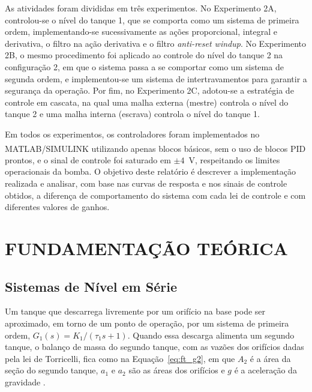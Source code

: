 \documentclass[a4paper,12pt]{article}
\begin{document}
\begin{justify}
    \hspace{4ex}As atividades foram divididas em três experimentos. No Experimento 2A, controlou-se o nível do tanque 1, que se comporta como um sistema de primeira ordem, implementando-se sucessivamente as ações proporcional, integral e derivativa, o filtro na ação derivativa e o filtro \textit{anti-reset windup}. No Experimento 2B, o mesmo procedimento foi aplicado ao controle do nível do tanque 2 na configuração 2, em que o sistema passa a se comportar como um sistema de segunda ordem, e implementou-se um sistema de intertravamentos para garantir a segurança da operação. Por fim, no Experimento 2C, adotou-se a estratégia de controle em cascata, na qual uma malha externa (mestre) controla o nível do tanque 2 e uma malha interna (escrava) controla o nível do tanque 1.
\end{justify}

\begin{justify}
    \hspace{4ex}Em todos os experimentos, os controladores foram implementados no MATLAB\textsuperscript{\textregistered}/SIMULINK\textsuperscript{\textregistered} utilizando apenas blocos básicos, sem o uso de blocos PID prontos, e o sinal de controle foi saturado em $\pm 4$~V, respeitando os limites operacionais da bomba. O objetivo deste relatório é descrever a implementação realizada e analisar, com base nas curvas de resposta e nos sinais de controle obtidos, a diferença de comportamento do sistema com cada lei de controle e com diferentes valores de ganhos.
\end{justify}

\newpage


\section{FUNDAMENTAÇÃO TEÓRICA}

\subsection{Sistemas de Nível em Série}
\label{sec:ft_nivel}

\begin{justify}
    \hspace{4ex}Um tanque que descarrega livremente por um orifício na base pode ser aproximado, em torno de um ponto de operação, por um sistema de primeira ordem, $G_1(s) = K_1/(\tau_1 s + 1)$. Quando essa descarga alimenta um segundo tanque, o balanço de massa do segundo tanque, com as vazões dos orifícios dadas pela lei de Torricelli, fica como na Equação~\eqref{eq:ft_g2}, em que $A_2$ é a área da seção do segundo tanque, $a_1$ e $a_2$ são as áreas dos orifícios e $g$ é a aceleração da gravidade \cite{ogata2010}.
\end{justify}
\end{document}
